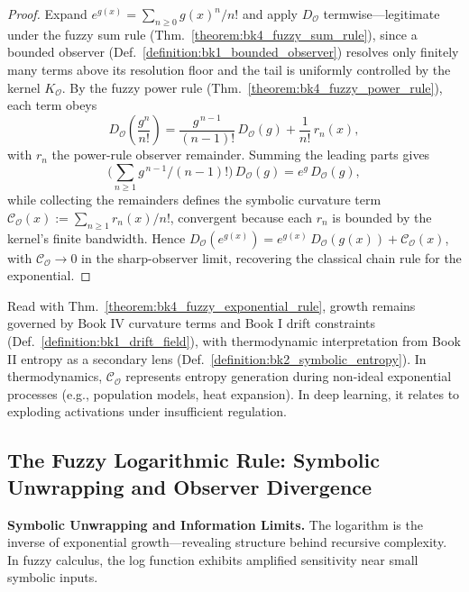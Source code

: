 \begin{proof}
\label{proof:bk4_fuzzy_exponential_rule}
\leavevmode
Expand $e^{g(x)} = \sum_{n \ge 0} g(x)^n/n!$ and apply $D_{\mathcal{O}}$ termwise---legitimate under the fuzzy sum rule (Thm.~\ref{theorem:bk4_fuzzy_sum_rule}), since a bounded observer (Def.~\ref{definition:bk1_bounded_observer}) resolves only finitely many terms above its resolution floor and the tail is uniformly controlled by the kernel $K_{\mathcal{O}}$. By the fuzzy power rule (Thm.~\ref{theorem:bk4_fuzzy_power_rule}), each term obeys
\[
D_{\mathcal{O}}\!\left(\frac{g^n}{n!}\right) = \frac{g^{\,n-1}}{(n-1)!}\,D_{\mathcal{O}}(g) + \frac{1}{n!}\,r_n(x),
\]
with $r_n$ the power-rule observer remainder. Summing the leading parts gives
\[
\bigl(\textstyle\sum_{n \ge 1} g^{\,n-1}/(n-1)!\bigr)\,D_{\mathcal{O}}(g) = e^{g}\,D_{\mathcal{O}}(g),
\]
while collecting the remainders defines the symbolic curvature term $\mathcal{C}_{\mathcal{O}}(x) := \sum_{n \ge 1} r_n(x)/n!$, convergent because each $r_n$ is bounded by the kernel's finite bandwidth. Hence $D_{\mathcal{O}}(e^{g(x)}) = e^{g(x)}\,D_{\mathcal{O}}(g(x)) + \mathcal{C}_{\mathcal{O}}(x)$, with $\mathcal{C}_{\mathcal{O}} \to 0$ in the sharp-observer limit, recovering the classical chain rule for the exponential.
\end{proof}

\begin{scholium}
\label{scholium:bk4_fuzzy_exponential_growth}
Read with Thm.~\ref{theorem:bk4_fuzzy_exponential_rule}, growth remains governed by Book IV curvature terms and Book I drift constraints (Def.~\ref{definition:bk1_drift_field}), with thermodynamic interpretation from Book II entropy as a secondary lens (Def.~\ref{definition:bk2_symbolic_entropy}).
In thermodynamics, $\mathcal{C}_{\mathcal{O}}$ represents entropy generation during non-ideal exponential processes (e.g., population models, heat expansion). In deep learning, it relates to exploding activations under insufficient regulation.
\end{scholium}

\subsection{The Fuzzy Logarithmic Rule: Symbolic Unwrapping and Observer Divergence}
\label{subsec:bk4_fuzzy_logarithmic_rule}

\textbf{Symbolic Unwrapping and Information Limits.} The logarithm is the inverse of exponential growth---revealing structure behind recursive complexity. In fuzzy calculus, the log function exhibits amplified sensitivity near small symbolic inputs.

